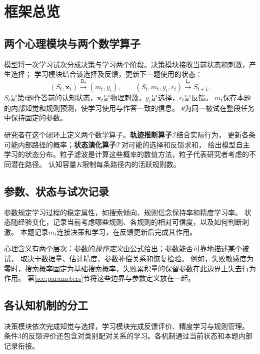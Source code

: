 \documentclass[11pt,a4paper]{article}
\numberwithin{equation}{section}
\newcommand{\Dd}{\mathsf{D}}
\newcommand{\Ll}{\mathsf{L}}
\newcommand{\Ii}{\mathcal{I}}
\newcommand{\Tt}{\mathcal{T}}
\begin{document}
\clearpage
{\small\setlength{\parskip}{0pt}\tableofcontents}
\clearpage

\section{框架总览}
\label{sec:overview}

\subsection{两个心理模块与两个数学算子}
模型将一次学习试次分成决策与学习两个阶段。决策模块接收当前状态和刺激，产生选择；
学习模块结合该选择及反馈，更新下一题使用的状态：
\begin{equation}
(S_t,\bm x_t)\xrightarrow{\Dd_\theta}(m_t,y_t),\qquad
(S_t,m_t,y_t,r_t)\xrightarrow{\Ll_\theta}S_{t+1}.
\label{eq:loop}
\end{equation}
$S_t$是第$t$题作答前的认知状态，$\bm x_t$是物理刺激，$y_t$是选择，$r_t$是反馈。
$m_t$保存本题的内部知觉和规则预测，使学习使用与作答一致的信息。
$\theta$为同一被试在整段任务中保持固定的参数。

研究者在这个闭环上定义两个数学算子。\textbf{轨迹推断算子}$\Ii$结合实际行为，
更新各条可能内部路径的概率；\textbf{状态演化算子}$\Tt$对可能的选择和反馈求和，
给出模型自主学习的状态分布。粒子滤波是计算这些概率的数值方法，粒子代表研究者考虑的不同潜在路径。
认知容量$K$限制每条路径内的活跃规则数。

\subsection{参数、状态与试次记录}
参数规定学习过程的稳定属性，如搜索倾向、规则信念保持率和精度学习率。
状态随经验变化，记录当前考虑哪些规则、各规则的相对可信度，以及如何判断刺激。
本题记录$m_t$连接决策和学习，在反馈更新后完成其作用。

心理含义有两个层次：参数的\emph{操作定义}由公式给出；参数能否可靠地描述某个被试，
取决于数据量、估计精度、参数补偿关系和恢复检验。
例如，失败敏感度为零时，搜索概率固定为基础搜索概率，失败累积量的保留参数在此边界上失去行为作用。
第\ref{sec:parameters}节将这些边界与参数定义放在一起。

\subsection{各认知机制的分工}
决策模块依次完成知觉与选择，学习模块完成反馈评价、精度学习与规则管理。
条件3的反馈评价还包含对类别配对关系的学习。各机制通过当前状态和本题内部记录衔接。
\end{document}

